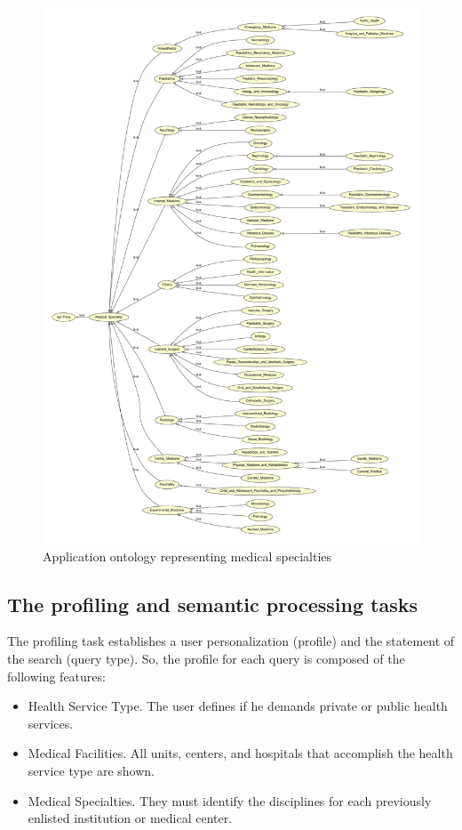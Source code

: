 \documentclass[sustainability,article,submit,pdftex,moreauthors]{Definitions/mdpi}
\begin{document}
\begin{figure}
	\begin{center}
		\includegraphics[width=1.0\textwidth]{onto.pdf}
	\end{center}
	\caption{Application ontology representing medical specialties\label{fig:ontologia}}
\end{figure}

\subsection{The profiling and semantic processing tasks}

The profiling task establishes a user personalization (profile) and the statement of the search (query type). So, the profile for each query is composed of the following features:

\begin{itemize}
\item Health Service Type. The user defines if he demands private or public health services.
\item Medical Facilities. All units, centers, and hospitals that accomplish the health service type are shown.
\item Medical Specialties. They must identify the disciplines for each previously enlisted institution or medical center.
\end{itemize}
\end{document}
